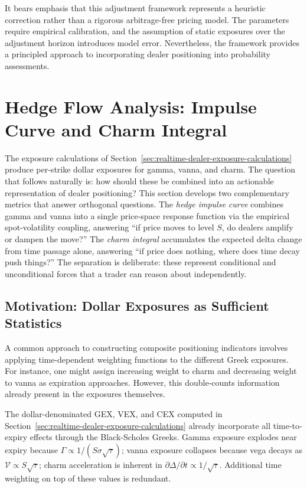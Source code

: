 \documentclass[11pt, a4paper]{article}
\begin{document}
It bears emphasis that this adjustment framework represents a heuristic correction rather than a rigorous arbitrage-free pricing model. The parameters require empirical calibration, and the assumption of static exposures over the adjustment horizon introduces model error. Nevertheless, the framework provides a principled approach to incorporating dealer positioning into probability assessments.



\section{Hedge Flow Analysis: Impulse Curve and Charm Integral}
\label{sec:hedge-flow}

The exposure calculations of Section~\ref{sec:realtime-dealer-exposure-calculations} produce per-strike dollar exposures for gamma, vanna, and charm. The question that follows naturally is: how should these be combined into an actionable representation of dealer positioning? This section develops two complementary metrics that answer orthogonal questions. The \emph{hedge impulse curve} combines gamma and vanna into a single price-space response function via the empirical spot-volatility coupling, answering ``if price moves to level $S$, do dealers amplify or dampen the move?'' The \emph{charm integral} accumulates the expected delta change from time passage alone, answering ``if price does nothing, where does time decay push things?'' The separation is deliberate: these represent conditional and unconditional forces that a trader can reason about independently.

\subsection{Motivation: Dollar Exposures as Sufficient Statistics}

A common approach to constructing composite positioning indicators involves applying time-dependent weighting functions to the different Greek exposures. For instance, one might assign increasing weight to charm and decreasing weight to vanna as expiration approaches. However, this double-counts information already present in the exposures themselves.

The dollar-denominated GEX, VEX, and CEX computed in Section~\ref{sec:realtime-dealer-exposure-calculations} already incorporate all time-to-expiry effects through the Black-Scholes Greeks. Gamma exposure explodes near expiry because $\Gamma \propto 1/(S\sigma\sqrt{\tau})$; vanna exposure collapses because vega decays as $\mathcal{V} \propto S\sqrt{\tau}$; charm acceleration is inherent in $\partial\Delta/\partial t \propto 1/\sqrt{\tau}$. Additional time weighting on top of these values is redundant.
\end{document}
